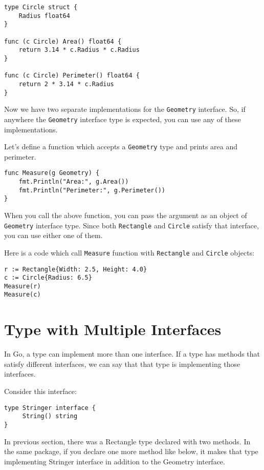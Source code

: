 \begin{lstlisting}[numbers=none]
type Circle struct {
    Radius float64
}

func (c Circle) Area() float64 {
    return 3.14 * c.Radius * c.Radius
}

func (c Circle) Perimeter() float64 {
    return 2 * 3.14 * c.Radius
}
\end{lstlisting}

Now we have two separate implementations for the \texttt{Geometry}
interface.  So, if anywhere the \texttt{Geometry} interface type is
expected, you can use any of these implementations.

Let's define a function which accepts a \texttt{Geometry} type and
prints area and perimeter.

\begin{lstlisting}[numbers=none]
func Measure(g Geometry) {
    fmt.Println("Area:", g.Area())
    fmt.Println("Perimeter:", g.Perimeter())
}
\end{lstlisting}

When you call the above function, you can pass the argument as an
object of \texttt{Geometry} interface type.  Since both
\texttt{Rectangle} and \texttt{Circle} satisfy that interface, you can
use either one of them.

Here is a code which call \texttt{Measure} function with
\texttt{Rectangle} and \texttt{Circle} objects:

\begin{lstlisting}[numbers=none]
r := Rectangle{Width: 2.5, Height: 4.0}
c := Circle{Radius: 6.5}
Measure(r)
Measure(c)
\end{lstlisting}

\section{Type with Multiple Interfaces}

In Go, a type can implement more than one interface.  If a type has
methods that satisfy different interfaces, we can say that that type
is implementing those interfaces.

Consider this interface:

\begin{lstlisting}[numbers=none]
type Stringer interface {
     String() string
}
\end{lstlisting}

In previous section, there was a Rectangle type declared with two
methods.  In the same package, if you declare one more method like
below, it makes that type implementing Stringer interface in addition
to the Geometry interface.

